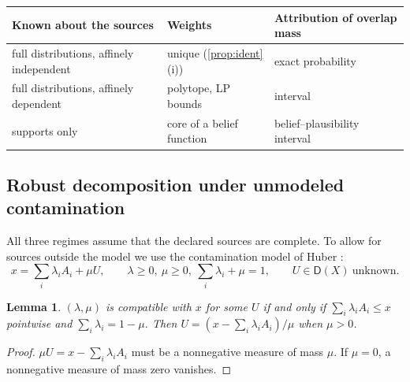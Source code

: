 \documentclass[11pt]{article}
\newtheorem{lemma}[theorem]{Lemma}
\theoremstyle{definition}
\theoremstyle{remark}
\newcommand{\D}{\mathsf{D}}
\begin{document}
\begin{center}
\begin{tabular}{@{}lll@{}}
\toprule
Known about the sources & Weights & Attribution of overlap mass\\
\midrule
full distributions, affinely independent & unique (\cref{prop:ident}(i)) & exact probability\\
full distributions, affinely dependent & polytope, LP bounds & interval\\
supports only & core of a belief function & belief--plausibility interval\\
\bottomrule
\end{tabular}
\end{center}

\subsection{Robust decomposition under unmodeled contamination}\label{sec:contam}

All three regimes assume that the declared sources are complete. To allow for sources outside the
model we use the contamination model of Huber \cite{Huber1964}:
\[
x=\sum_i\lambda_iA_i+\mu U,\qquad \lambda\ge0,\ \mu\ge0,\ \sum_i\lambda_i+\mu=1,\qquad U\in\D(X)\
\text{unknown}.
\]

\begin{lemma}\label{lem:contam}
$(\lambda,\mu)$ is compatible with $x$ for some $U$ if and only if $\sum_i\lambda_iA_i\le x$ pointwise and
$\sum_i\lambda_i=1-\mu$. Then $U=(x-\sum_i\lambda_iA_i)/\mu$ when $\mu>0$.
\end{lemma}
\begin{proof}
$\mu U=x-\sum_i\lambda_iA_i$ must be a nonnegative measure of mass $\mu$. If $\mu=0$, a nonnegative
measure of mass zero vanishes.
\end{proof}
\end{document}
